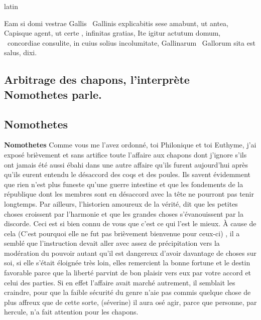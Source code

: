 \documentclass[12pt]{book}
\renewenvironment{latin}
    	{\begin{hyphenrules}{latin}}
    	{\end{hyphenrules}}
\begin{document}
\begin{pages}
\begin{latin}
\begin{Leftside}
                    Eam si domi vestrae Gallis ﻿\ampersand\ Gallinis explicabitis sese amabunt, ut antea, 
                    Capisque agent, ut certe , infinitas gratias, 
                    Ite igitur actutum domum, ﻿\ampersand\ concordiae consulite, 
                    in cuius solius incolumitate, Gallinarum ﻿\ampersand\ Gallorum sita est salus, dixi.
                \pend 
        \endnumbering
        \end{Leftside}
        \end{latin}

        \begin{Rightside}
        \beginnumbering
            \pstart\section*{Arbitrage des chapons, l'interprète Nomothetes parle.}\pend\pstart\subsection*{Nomothetes}\pend\pstart\textbf{Nomothetes}\hspace{1cm} 
                        Comme vous me l’avez ordonné, toi Philonique et toi Euthyme, j’ai exposé brièvement et sans artifice toute l’affaire aux chapons dont j’ignore s’ils ont jamais été aussi ébahi dans une autre affaire qu’ils furent aujourd’hui après qu’ils eurent entendu le désaccord des coqs et des poules.
                        Ils savent évidemment que rien n’est plus funeste qu’une guerre intestine  et que les fondements de la république dont les membres sont en désaccord avec la tête ne pourront pas tenir longtemps. Par ailleurs, l’historien amoureux de la vérité, dit que les petites choses croissent par l’harmonie et que les grandes choses s’évanouissent par la discorde. Ceci est si bien connu de vous que c'est ce qui l'est le mieux. 
                        À cause de cela (C’est pourquoi elle ne fut pas brièvement bienvenue pour ceux-ci) , il a semblé que l’instruction devait aller avec assez de précipitation vers la modération du pouvoir autant qu’il est dangereux d’avoir davantage de choses sur soi, si elle s’était éloignée très loin, elles remercient la bonne fortune et le destin favorable parce que la liberté parvint de bon plaisir vers eux par votre accord et celui des parties. Si en effet l’affaire avait marché autrement, il semblait les craindre, pour que la faible sécurité du genre n’aie pas commis quelque chose de plus affreux que de cette sorte, (séverine) il aura osé agir, parce que personne, par hercule, n’a fait attention pour les chapons.


\end{Rightside}
\end{pages}
\end{document}
